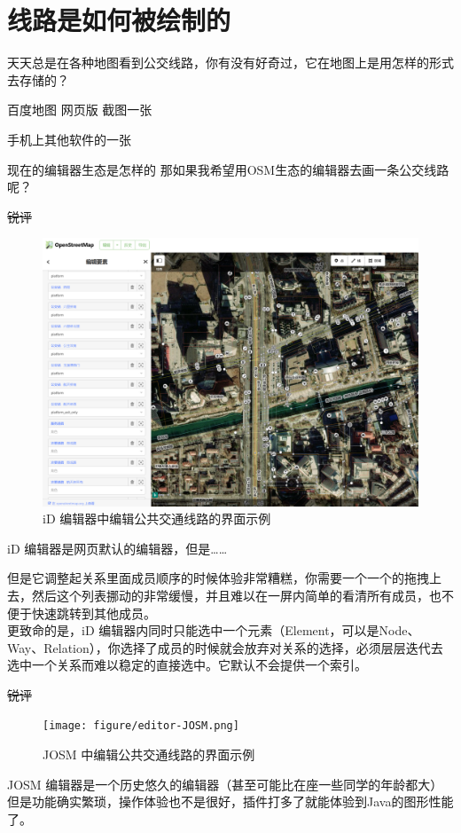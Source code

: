 \documentclass{beamer}
\begin{document}
\section{线路是如何被绘制的}

\begin{frame}
    \Large
    天天总是在各种地图看到公交线路，你有没有好奇过，它在地图上是用怎样的形式去存储的？
\end{frame}

\begin{frame}

    百度地图 网页版 截图一张

    手机上其他软件的一张
\end{frame}

\begin{frame}{现在的编辑器生态是怎样的}
    那如果我希望用OSM生态的编辑器去画一条公交线路呢？
\end{frame}

\begin{frame}{\sout{锐评}}
    \begin{figure}[htpb]
        \centering
        \includegraphics[width=0.5\linewidth]{figure/editor-iD.png}
        \caption{iD 编辑器中编辑公共交通线路的界面示例}
    \end{figure}
    \quad \quad iD 编辑器是网页默认的编辑器，但是……
\end{frame}

\begin{frame}
    \quad \quad 但是它调整起关系里面成员顺序的时候体验非常糟糕，你需要一个一个的拖拽上去，然后这个列表挪动的非常缓慢，并且难以在一屏内简单的看清所有成员，也不便于快速跳转到其他成员。\\
    \quad \quad 更致命的是，iD 编辑器内同时只能选中一个元素（Element，可以是Node、Way、Relation），你选择了成员的时候就会放弃对关系的选择，必须层层迭代去选中一个关系而难以稳定的直接选中。它默认不会提供一个索引。
\end{frame}

\begin{frame}{\sout{锐评}}
    \begin{figure}[htpb]
        \centering
        \texttt{[image: figure/editor-JOSM.png]}
        \caption{JOSM 中编辑公共交通线路的界面示例}
    \end{figure}
    \quad \quad JOSM 编辑器是一个历史悠久的编辑器（甚至可能比在座一些同学的年龄都大）\\
    \quad \quad 但是功能确实繁琐，操作体验也不是很好，插件打多了就能体验到Java的图形性能了。
\end{frame}
\end{document}
